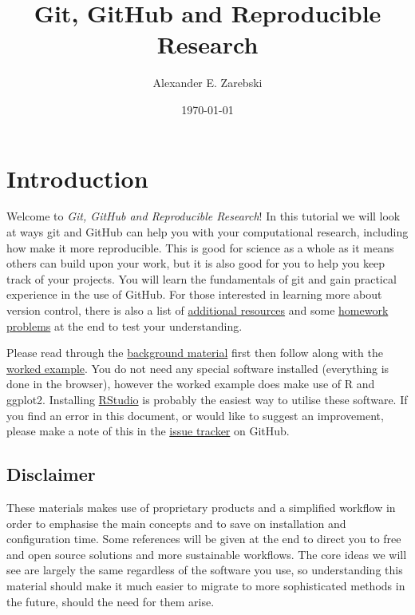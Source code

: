 \documentclass[11pt,onecolumn]{scrartcl}
\author{Alexander E. Zarebski}
\date{\today}
\title{Git, GitHub and Reproducible Research}
\begin{document}
\maketitle
\setcounter{tocdepth}{2}
\tableofcontents


\section{Introduction}
\label{sec:org2135dc9}

Welcome to \emph{Git, GitHub and Reproducible Research}! In this tutorial we will
look at ways git and GitHub can help you with your computational research,
including how make it more reproducible. This is good for science as a whole as
it means others can build upon your work, but it is also good for you to help
you keep track of your projects. You will learn the fundamentals of git and gain
practical experience in the use of GitHub. For those interested in learning more
about version control, there is also a list of \hyperref[sec:org170d947]{additional resources} and some
\hyperref[sec:org0fd2d36]{homework problems} at the end to test your understanding.

Please read through the \hyperref[sec:orgac4e4b4]{background material} first then follow along with the \hyperref[sec:orga542221]{worked example}. You do not need any special software installed (everything is
done in the browser), however the worked example does make use of R and ggplot2.
Installing \href{https://www.rstudio.com/}{RStudio} is probably the easiest way to utilise these software. If you
find an error in this document, or would like to suggest an improvement, please
make a note of this in the \href{https://github.com/aezarebski/github-tutorial/issues/new/choose}{issue tracker} on GitHub.

\subsection{Disclaimer}
\label{sec:orgd463482}

These materials makes use of proprietary products and a simplified workflow in
order to emphasise the main concepts and to save on installation and
configuration time. Some references will be given at the end to direct you to
free and open source solutions and more sustainable workflows. The core ideas we
will see are largely the same regardless of the software you use, so
understanding this material should make it much easier to migrate to more
sophisticated methods in the future, should the need for them arise.
\end{document}
